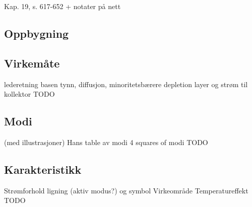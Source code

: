 Kap. 19, s. 617-652
+ notater på nett

\subsection{Oppbygning}


\subsection{Virkemåte}
lederetning
basen tynn, diffusjon, minoritetsbærere
depletion layer og strøm til kollektor
TODO

\subsection{Modi}
(med illustrasjoner)
Hans table av modi
4 squares of modi
TODO

\subsection{Karakteristikk}
Strømforhold ligning (aktiv modus?) og symbol
Virkeområde
Temperatureffekt
TODO

